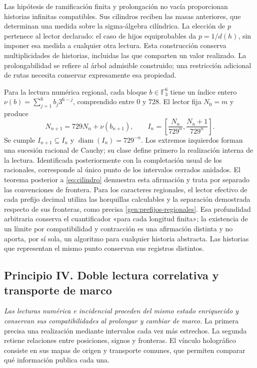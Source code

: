 Las hipótesis de ramificación finita y prolongación no vacía proporcionan
historias infinitas compatibles. Sus cilindros reciben las masas anteriores,
que determinan una medida sobre la sigma-álgebra cilíndrica. La elección de
\(p\) pertenece al lector declarado: el caso de hijos equiprobables da
\(p=1/d(h)\), sin imponer esa medida a cualquier otra lectura. Esta
construcción conserva multiplicidades de historias, incluidas las que
comparten un valor realizado. La prolongabilidad se refiere al árbol
admisible construido; una restricción adicional de rutas necesita conservar
expresamente esa propiedad.

Para la lectura numérica regional, cada bloque
\(b\in\mathbb F_3^6\) tiene un índice entero
\(\nu(b)=\sum_{j=1}^6 b_j3^{6-j}\), comprendido entre 0 y 728.
El lector fija \(N_0=m\) y produce
\[
 N_{n+1}=729N_n+\nu(b_{n+1}),\qquad
 I_n=\left[\frac{N_n}{729^n},\frac{N_n+1}{729^n}\right].
\]
Se cumple \(I_{n+1}\subseteq I_n\) y
\(\operatorname{diam}(I_n)=729^{-n}\). Los extremos izquierdos forman
una sucesión racional de Cauchy; su clase define primero la realización
interna de la lectura. Identificada posteriormente con la completación
usual de los racionales, corresponde al único punto de los intervalos
cerrados anidados. El teorema posterior a \eqref{eq:cilindro} demuestra
esta afirmación y trata por separado las convenciones de frontera. Para
los caracteres regionales, el lector efectivo de cada prefijo decimal
utiliza las horquillas calculables y la separación demostrada respecto de
sus fronteras, como precisa \cref{gen:prefijos-regionales}. Esa profundidad
arbitraria conserva el cuantificador «para cada longitud finita»; la
existencia de un límite por compatibilidad y contracción es una afirmación
distinta y no aporta, por sí sola, un algoritmo para cualquier historia
abstracta. Las historias que representan el mismo punto conservan sus
registros distintos.

\subsection*{Principio IV. Doble lectura correlativa y transporte de marco}
\hypertarget{prinh:doble}{}

\emph{Las lecturas numérica e incidencial proceden del mismo estado
enriquecido y conservan sus compatibilidades al prolongar y cambiar de
marco.} La primera precisa una realización mediante intervalos cada vez
más estrechos. La segunda retiene relaciones entre posiciones, signos y
fronteras. El vínculo holográfico consiste en sus mapas de origen y
transporte comunes, que permiten comparar qué información publica cada una.

